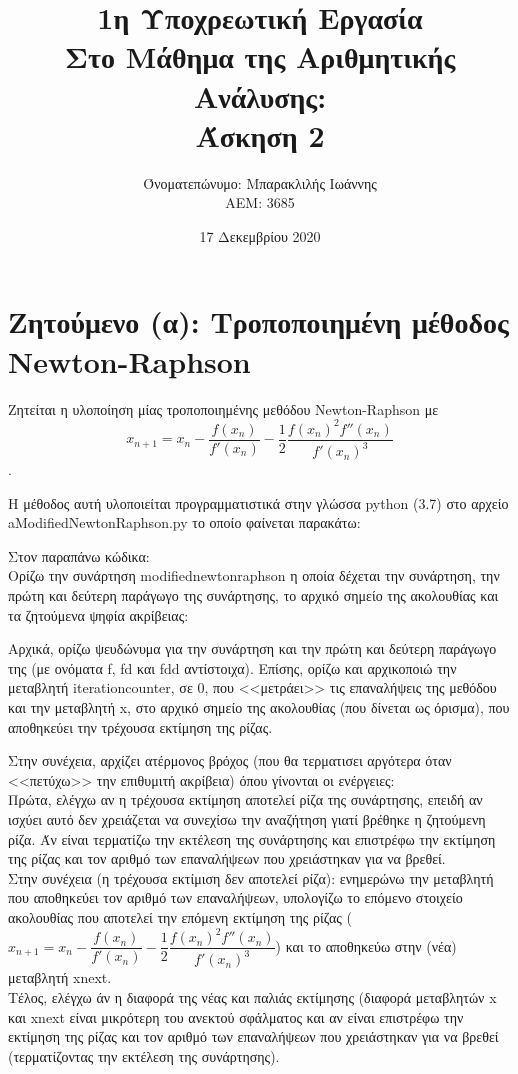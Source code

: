 \documentclass[a4paper,11pt]{article}
\title{1η Υποχρεωτική Εργασία \\ Στο Μάθημα της Αριθμητικής Ανάλυσης: \\ Άσκηση 2}
\author{Όνοματεπώνυμο: Μπαρακλιλής Ιωάννης  \\  ΑΕΜ: 3685}
\date{17 Δεκεμβρίου 2020}
\newcommand{\lt}{\latintext}
\newcommand{\gt}{\greektext}
\begin{document}
\maketitle

\section{Ζητούμενο (α): Τροποποιημένη μέθοδος {\lt Newton-Raphson}}
Ζητείται η υλοποίηση μίας τροποποιημένης μεθόδου {\lt Newton-Raphson} με \lt \[x_{n+1} = x_n - \dfrac{f(x_n)}{f'(x_n)} - \dfrac{1}{2}\dfrac{f(x_n)^2f''(x_n)}{f'(x_n)^3} \].

\gt

Η μέθοδος αυτή υλοποιείται προγραμματιστικά στην γλώσσα {\lt python} (3.7) στο αρχείο {\lt a\textunderscore Modified\textunderscore Newton\textunderscore Raphson.py} το οποίο φαίνεται παρακάτω:

\lt

\gt

Στον παραπάνω κώδικα:\\
Ορίζω την συνάρτηση {\lt modified\textunderscore newton\textunderscore raphson} η οποία δέχεται την συνάρτηση, την πρώτη και δεύτερη παράγωγο της συνάρτησης, το αρχικό σημείο της ακολουθίας και τα ζητούμενα ψηφία ακρίβειας:\par
Αρχικά, ορίζω ψευδώνυμα για την συνάρτηση και την πρώτη και δεύτερη παράγωγο της (με ονόματα {\lt f}, {\lt f\textunderscore d} και {\lt f\textunderscore dd} αντίστοιχα).
Επίσης, ορίζω και αρχικοποιώ την μεταβλητή {\lt iteration\textunderscore counter}, σε 0,  που <<μετράει>> τις επαναλήψεις της μεθόδου και την μεταβλητή {\lt x}, στο αρχικό σημείο της ακολουθίας (που δίνεται ως όρισμα), που αποθηκεύει την τρέχουσα εκτίμηση της ρίζας.

Στην συνέχεια, αρχίζει ατέρμονος βρόχος (που θα τερματισει αργότερα όταν <<πετύχω>> την επιθυμιτή ακρίβεια) όπου γίνονται οι ενέργειες:\\
Πρώτα, ελέγχω αν η τρέχουσα εκτίμηση αποτελεί ρίζα της συνάρτησης, επειδή αν ισχύει αυτό δεν χρειάζεται να συνεχίσω την αναζήτηση γιατί βρέθηκε η ζητούμενη ρίζα. Άν είναι τερματίζω την εκτέλεση της συνάρτησης και επιστρέφω την εκτίμηση της ρίζας και τον αριθμό των επαναλήψεων που χρειάστηκαν για να βρεθεί.\\
Στην συνέχεια (η τρέχουσα εκτίμιση δεν αποτελεί ρίζα): ενημερώνω την μεταβλητή που αποθηκεύει τον αριθμό των επαναλήψεων, υπολογίζω το επόμενο στοιχείο ακολουθίας που αποτελεί την επόμενη εκτίμηση της ρίζας ($x_{n+1} = x_n - \dfrac{f(x_n)}{f'(x_n)} - \dfrac{1}{2}\dfrac{f(x_n)^2f''(x_n)}{f'(x_n)^3}$) και το αποθηκεύω στην (νέα) μεταβλητή {\lt x\textunderscore next}.\\
Τέλος, ελέγχω άν η διαφορά της νέας και παλιάς εκτίμησης (διαφορά μεταβλητών {\lt x} και {\lt x\textunderscore next} είναι μικρότερη του ανεκτού σφάλματος και αν είναι επιστρέφω την εκτίμηση της ρίζας και τον αριθμό των επαναλήψεων που χρειάστηκαν για να βρεθεί (τερματίζοντας την εκτέλεση της συνάρτησης).
\end{document}
